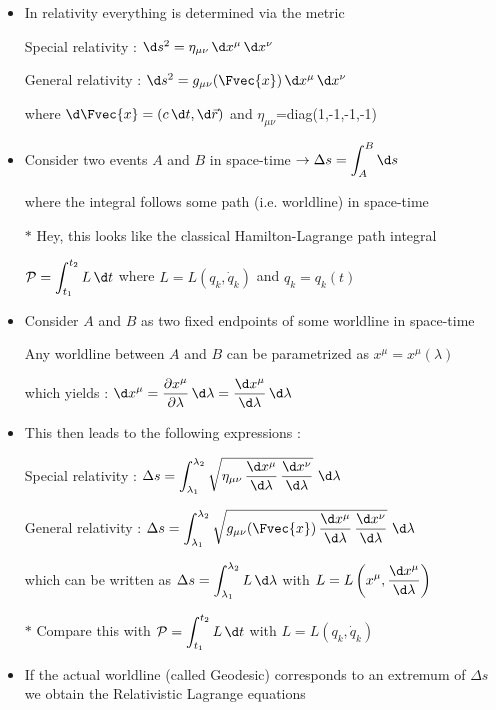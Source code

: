 \begin{itemize}
\item In relativity everything is determined via the metric
\item[] Special relativity : $\d s^{2}=\eta_{\mu \nu}\, \d x^{\mu}\, \d x^{\nu}$
\item[] General relativity : $\d s^{2}=g_{\mu \nu}(\Fvec{x})\, \d x^{\mu}\, \d x^{\nu}$
\item[] where $\d\Fvec{x}=(c\,\d t,\d\vec{r})$ and $\eta_{\mu\nu}$=diag(1,-1,-1,-1)
\item Consider two events $A$ and $B$ in space-time $\rightarrow \displaystyle \Delta s=\int_{A}^{B} \d s$
\item[] where the integral follows some path (i.e. worldline) in space-time
\item[$\ast$] {\blue Hey, this looks like the classical Hamilton-Lagrange path integral}
\item[] $\displaystyle {\cal P}=\int_{t_{1}}^{t_{2}} L\, \d t$ where $L=L(q_{k},\dot{q}_{k})$ and $q_{k}=q_{k}(t)$
\item Consider $A$ and $B$ as two fixed endpoints of some worldline in space-time
\item[] Any worldline between $A$ and $B$ can be parametrized as $x^{\mu}=x^{\mu}(\lambda)$
\item[] which yields : $\displaystyle \d x^{\mu}=\frac{\partial x^{\mu}}{\partial \lambda}\, \d \lambda=
        \frac{\d x^{\mu}}{\d \lambda}\,\d \lambda$
\end{itemize}

\Tr
\begin{itemize}
\item This then leads to the following expressions :
\item[] Special relativity : $\displaystyle \Delta s=\int_{\lambda_{1}}^{\lambda_{2}}
        \sqrt{\eta_{\mu \nu}\, \frac{\d x^{\mu}}{\d \lambda}\, \frac{\d x^{\nu}}{\d \lambda}}\,\, \d \lambda$
\item[] General relativity : $\displaystyle \Delta s=\int_{\lambda_{1}}^{\lambda_{2}}
        \sqrt{g_{\mu \nu}(\Fvec{x})\, \frac{\d x^{\mu}}{\d \lambda}\, \frac{\d x^{\nu}}{\d \lambda}}\,\, \d \lambda$
\item[] which can be written as {\blue $\displaystyle \Delta s=\int_{\lambda_{1}}^{\lambda_{2}} L\, \d \lambda$}
      with {\blue $\displaystyle L=L\left(x^{\mu},\frac{\d x^{\mu}}{\d \lambda} \right)$}
\item[$\ast$] Compare this with $\displaystyle {\cal P}=\int_{t_{1}}^{t_{2}} L\, \d t$ with $L=L(q_{k},\dot{q}_{k})$
\item {\blue If the actual worldline (called {\red Geodesic}) corresponds to an extremum of $\Delta s$}\\
      we obtain the {\blue Relativistic Lagrange equations}
\end{itemize}
%
\begin{center}
{\red {}}
\end{center}
